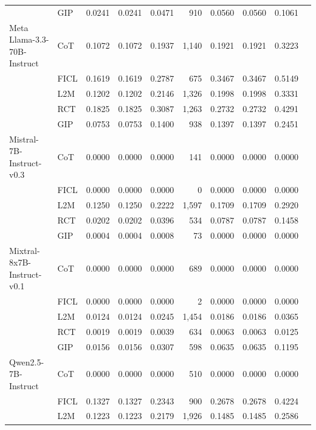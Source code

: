 \documentclass[conference]{IEEEtran}
\begin{document}
\begin{longtable}{p{3.5cm} l r r r r r r r r}
                  & GIP  & 0.0241 & 0.0241 & 0.0471 & 910 & 0.0560 & 0.0560 & 0.1061 \\ \addlinespace
Meta Llama-3.3-70B-Instruct & CoT  & 0.1072 & 0.1072 & 0.1937 & 1,140 & 0.1921 & 0.1921 & 0.3223 \\
                            & FICL & 0.1619 & 0.1619 & 0.2787 & 675 & 0.3467 & 0.3467 & 0.5149 \\
                            & L2M  & 0.1202 & 0.1202 & 0.2146 & 1,326 & 0.1998 & 0.1998 & 0.3331 \\
                            & RCT  & 0.1825 & 0.1825 & 0.3087 & 1,263 & 0.2732 & 0.2732 & 0.4291 \\
                            & GIP  & 0.0753 & 0.0753 & 0.1400 & 938 & 0.1397 & 0.1397 & 0.2451 \\ \addlinespace
Mistral-7B-Instruct-v0.3 & CoT  & 0.0000 & 0.0000 & 0.0000 & 141 & 0.0000 & 0.0000 & 0.0000 \\
                         & FICL & 0.0000 & 0.0000 & 0.0000 & 0 & 0.0000 & 0.0000 & 0.0000 \\
                         & L2M  & 0.1250 & 0.1250 & 0.2222 & 1,597 & 0.1709 & 0.1709 & 0.2920 \\
                         & RCT  & 0.0202 & 0.0202 & 0.0396 & 534 & 0.0787 & 0.0787 & 0.1458 \\
                         & GIP  & 0.0004 & 0.0004 & 0.0008 & 73 & 0.0000 & 0.0000 & 0.0000 \\ \addlinespace
Mixtral-8x7B-Instruct-v0.1 & CoT  & 0.0000 & 0.0000 & 0.0000 & 689 & 0.0000 & 0.0000 & 0.0000 \\
                           & FICL & 0.0000 & 0.0000 & 0.0000 & 2 & 0.0000 & 0.0000 & 0.0000 \\
                           & L2M  & 0.0124 & 0.0124 & 0.0245 & 1,454 & 0.0186 & 0.0186 & 0.0365 \\
                           & RCT  & 0.0019 & 0.0019 & 0.0039 & 634 & 0.0063 & 0.0063 & 0.0125 \\
                           & GIP  & 0.0156 & 0.0156 & 0.0307 & 598 & 0.0635 & 0.0635 & 0.1195 \\ \addlinespace
Qwen2.5-7B-Instruct & CoT  & 0.0000 & 0.0000 & 0.0000 & 510 & 0.0000 & 0.0000 & 0.0000 \\
                    & FICL & 0.1327 & 0.1327 & 0.2343 & 900 & 0.2678 & 0.2678 & 0.4224 \\
                    & L2M  & 0.1223 & 0.1223 & 0.2179 & 1,926 & 0.1485 & 0.1485 & 0.2586 \\

\end{longtable}
\end{document}

